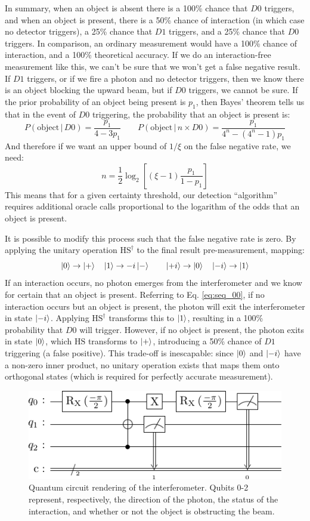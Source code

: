 \documentclass{article}
\newcommand{\Prob}[2]{P\left(#1\,|\,#2\right)}
\newcommand{\Hgt}{\text{H}}
\newcommand{\Sgt}{\text{S}}
\begin{document}
In summary, when an object is absent there is a 100\% chance that $D0$ triggers, and when an object is present, there is a 50\% chance of interaction (in which case no detector triggers), a 25\% chance that $D1$ triggers, and a 25\% chance that $D0$ triggers. In comparison, an ordinary measurement would have a 100\% chance of interaction, and a 100\% theoretical accuracy. If we do an interaction-free measurement like this, we can't be sure that we won't get a false negative result. If $D1$ triggers, or if we fire a photon and no detector triggers, then we know there is an object blocking the upward beam, but if $D0$ triggers, we cannot be sure. If the prior probability of an object being present is $p_1$, then Bayes' theorem tells us that in the event of $D0$ triggering, the probability that an object is present is:
$$\Prob{\text{object}}{D0} = \frac{p_1}{4 - 3 p_1} \qquad \Prob{\text{object}}{n \times D0} = \frac{p_1}{4^n - (4^n - 1) p_1}$$
And therefore if we want an upper bound of $1/\xi$ on the false negative rate, we need:
$$n = \frac{1}{2} \log_2 \left[ (\xi - 1) \frac{p_1}{1 - p_1}\right]$$
This means that for a given certainty threshold, our detection ``algorithm'' requires additional oracle calls proportional to the logarithm of the odds that an object is present.

It is possible to modify this process such that the false negative rate is zero. By applying the unitary operation $\Hgt\Sgt^\dagger$ to the final result pre-measurement, mapping:
$$\ket 0 \to \ket + \quad \ket 1 \to - i \ket - \qquad \ket{+i} \to \ket 0 \quad \ket{-i} \to \ket 1$$
If an interaction occurs, no photon emerges from the interferometer and we know for certain that an object is present. Referring to Eq. \ref{eq:seq_00}, if no interaction occurs but an object is present, the photon will exit the interferometer in state $\ket{-i}$. Applying $\Hgt\Sgt^\dagger$ transforms this to $\ket 1$, resulting in a 100\% probability that $D0$ will trigger. However, if no object is present, the photon exits in state $\ket 0$, which $\Hgt\Sgt$ transforms to $\ket +$, introducing a 50\% chance of $D1$ triggering (a false positive). This trade-off is inescapable: since $\ket 0$ and $\ket{-i}$ have a non-zero inner product, no unitary operation exists that maps them onto orthogonal states (which is required for perfectly accurate measurement).

\begin{figure}
\includegraphics[scale=0.5]{circuit-render}
\centering
\caption{Quantum circuit rendering of the interferometer. Qubits 0-2 represent, respectively, the direction of the photon, the status of the interaction, and whether or not the object is obstructing the beam.}
\label{fig:circuit-render}
\end{figure}
\end{document}

